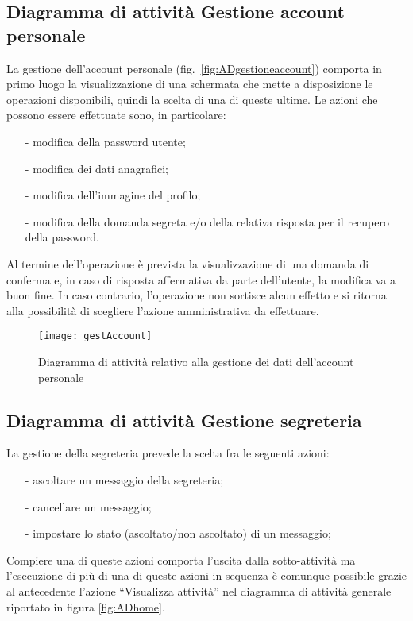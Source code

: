 \subsection{Diagramma di attività Gestione account personale}
La gestione dell'account personale (fig.~\vref{fig:ADgestioneaccount}) comporta in primo luogo la visualizzazione di una schermata che mette a disposizione le operazioni disponibili, quindi la scelta di una di queste ultime. Le azioni che possono essere effettuate sono, in particolare:
\begin{itemize}[noitemsep,nolistsep]
  \item[-] modifica della password utente;
  \item[-] modifica dei dati anagrafici;
  \item[-] modifica dell'immagine del profilo;
  \item[-] modifica della domanda segreta e/o della relativa risposta per il recupero della password.
\end{itemize}

Al termine dell'operazione è prevista la visualizzazione di una domanda di conferma e, in caso di risposta affermativa da parte dell'utente, la modifica va a buon fine. In caso contrario, l'operazione non sortisce alcun effetto e si ritorna alla possibilità di scegliere l'azione amministrativa da effettuare.

\begin{figure}[H]
  \centering
  \texttt{[image: gestAccount]}
  \caption{Diagramma di attività relativo alla gestione dei dati dell'account personale}\label{fig:ADgestioneaccount}
\end{figure}

\subsection{Diagramma di attività Gestione segreteria}
La gestione della segreteria prevede la scelta fra le seguenti azioni:
\begin{itemize}[noitemsep,nolistsep]
 \item[-] ascoltare un messaggio della segreteria;
 \item[-] cancellare un messaggio;
 \item[-] impostare lo stato (ascoltato/non ascoltato) di un messaggio;
\end{itemize}

Compiere una di queste azioni comporta l'uscita dalla sotto-attività ma l'esecuzione di più di una di queste azioni in sequenza è comunque possibile grazie al  antecedente l'azione ``Visualizza attività'' nel diagramma di attività generale riportato in figura \vref{fig:ADhome}.

